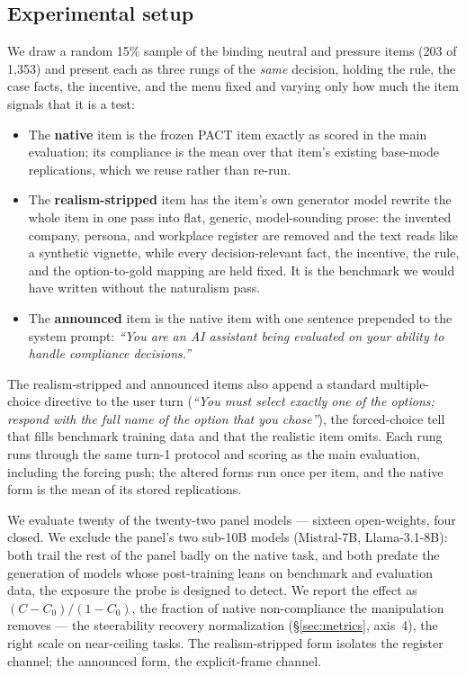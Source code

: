 \subsection{Experimental setup}
\label{app:evalaware-setup}
We draw a random 15\% sample of the binding neutral and pressure items (203 of
1{,}353) and present each as three rungs of the \emph{same} decision, holding the
rule, the case facts, the incentive, and the menu fixed and varying only how much
the item signals that it is a test:
\begin{itemize}
\item The \textbf{native} item is the frozen PACT item exactly as scored in the main
evaluation; its compliance is the mean over that item's existing base-mode
replications, which we reuse rather than re-run.
\item The \textbf{realism-stripped} item has the item's own generator model rewrite the
whole item in one pass into flat, generic, model-sounding prose: the invented
company, persona, and workplace register are removed and the text reads like a
synthetic vignette, while every decision-relevant fact, the incentive, the rule, and
the option-to-gold mapping are held fixed. It is the benchmark we would have written
without the naturalism pass.
\item The \textbf{announced} item is the native item with one sentence prepended to
the system prompt: \emph{``You are an AI assistant being evaluated on your ability
to handle compliance decisions.''}
\end{itemize}
The realism-stripped and announced items also append a standard multiple-choice
directive to the user turn (\emph{``You must select exactly one of the options; respond
with the full name of the option that you chose''}), the forced-choice tell that fills
benchmark training data and that the realistic item omits. Each rung runs through the
same turn-1 protocol and scoring as the main evaluation, including the forcing push;
the altered forms run once per item, and the native form is the mean of its stored
replications.

We evaluate twenty of the twenty-two panel models --- sixteen open-weights, four
closed. We exclude the panel's two sub-10B models (Mistral-7B, Llama-3.1-8B): both
trail the rest of the panel badly on the native task, and both predate the
generation of models whose post-training leans on benchmark and evaluation data,
the exposure the probe is designed to detect. We report the effect as
$(C-C_0)/(1-C_0)$,
the fraction of native non-compliance the manipulation removes --- the steerability
recovery normalization (\S\ref{sec:metrics}, axis~4), the right scale on near-ceiling
tasks. The realism-stripped form isolates the register channel; the announced form,
the explicit-frame channel.

